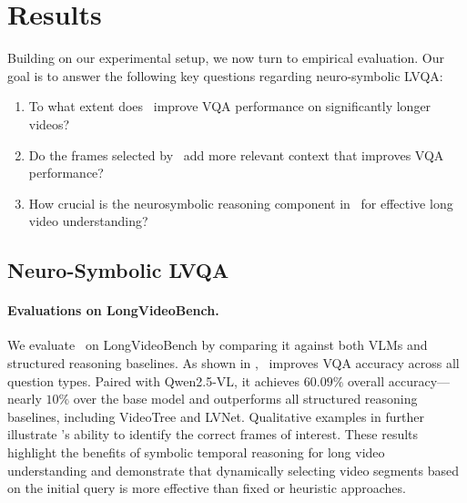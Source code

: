 \documentclass[letterpaper]{article} %
\begin{document}

\section{Results}
\label{sec:results}

    Building on our experimental setup, we now turn to empirical evaluation. Our goal is to answer the following key questions regarding neuro-symbolic LVQA:
    
    \begin{enumerate}
        \item To what extent does \nsvqa\ improve VQA performance on significantly longer videos?
        \item Do the frames selected by \nsvqa\ add more relevant context that improves VQA performance?
        \item How crucial is the neurosymbolic reasoning component in \nsvqa\ for effective long video understanding?
    \end{enumerate}

    \subsection{Neuro-Symbolic LVQA}
        \paragraph{Evaluations on LongVideoBench.}
        We evaluate \nsvqa\ on LongVideoBench by comparing it against both VLMs and structured reasoning baselines. As shown in , \nsvqa\ improves VQA accuracy across all question types. Paired with Qwen2.5-VL, it achieves $60.09\%$ overall accuracy---nearly $10\%$ over the base model and outperforms all structured reasoning baselines, including VideoTree and LVNet. Qualitative examples in  further illustrate \nsvqa's ability to identify the correct frames of interest. These results highlight the benefits of symbolic temporal reasoning for long video understanding and demonstrate that dynamically selecting video segments based on the initial query is more effective than fixed or heuristic approaches.
\end{document}
